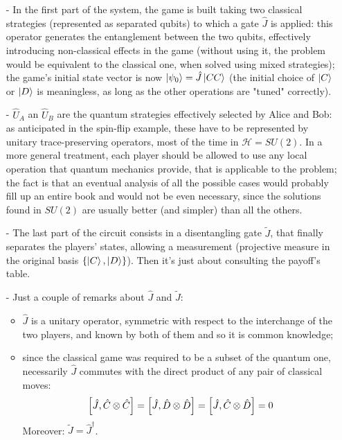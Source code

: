 \begin{itemize}[noitemsep]
	\item[-] In the first part of the system, the game is built taking two classical strategies (represented as separated qubits) to which a gate $\hat{J}$ is applied: this operator generates the entanglement between the two qubits, effectively introducing non-classical effects in the game (without using it, the problem would be equivalent to the classical one, when solved using mixed strategies); the game's initial state vector is now $\ket{\psi_0} = \hat{J}\ket{CC}$ (the initial choice of $\ket{C}$ or $\ket{D}$ is meaningless, as long as the other operations are "tuned" correctly).
	\item[-] $\hat{U}_A$ an $\hat{U}_B$ are the quantum strategies effectively selected by Alice and Bob: as anticipated in the spin-flip example, these have to be represented by unitary trace-preserving operators, most of the time in $\mathcal{H}=SU(2)$. In a more general treatment, each player should be allowed to use any local operation that quantum mechanics provide, that is applicable to the problem; the fact is that an eventual analysis of all the possible cases would probably fill up an entire book and would not be even necessary, since the solutions found in $SU(2)$ are usually better (and simpler) than all the others.
	\item[-] The last part of the circuit consists in a disentangling gate $\tilde{J}$, that finally separates the players' states, allowing a measurement (projective measure in the original basis $\{\ket{C},\ket{D}\}$). Then it's just about consulting the payoff's table.
	\item[-] Just a couple of remarks about $\hat{J}$ and $\tilde{J}$:
	\begin{itemize}
		\item $\hat{J}$ is a unitary operator, symmetric with respect to the interchange of the two players, and known by both of them and so it is common knowledge;
		\item since the classical game was required to be a subset of the quantum one, necessarily $\hat{J}$ commutes with the direct product of any pair of
classical moves:
		\[ \comm{\hat{J}}{\hat{C}\otimes\hat{C}} = \comm{\hat{J}}{\hat{D}\otimes\hat{D}} = \comm{\hat{J}}{\hat{C}\otimes\hat{D}} = 0 \]
		Moreover: $\tilde{J} = \hat{J}^\dagger$.	
	\end{itemize}
\end{itemize}


